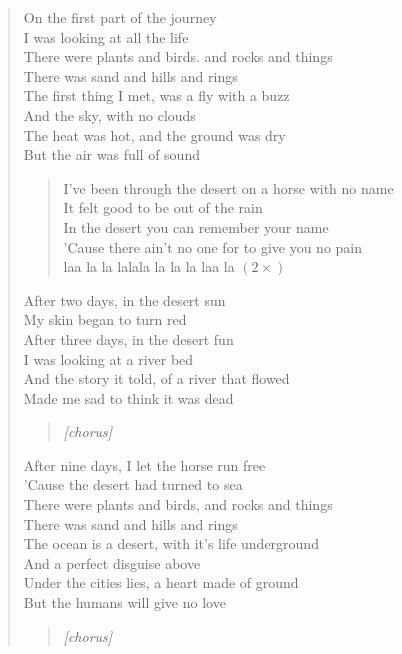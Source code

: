 \documentclass[9pt,a4paper,oneside, onecolumn]{article}
\begin{document}
\begin{verse}
On the  \Em{}first part of the journey\\
I was \Em{}looking at all the life\\
There were \Em{}plants and birds. and rocks and things\\
There was \Em{}sand and hills and rings\\
The \Em{}first thing I met, was a fly with a buzz\\
And the \Em{}sky, with no clouds\\
The \Em{}heat was hot, and the ground was dry\\
But the \Em{}air was full of sound\\


\begin{verse}
I've been through the desert on a horse with no name\\
It felt good to be out of the rain\\
In the desert you can remember your name\\
'Cause there ain't no one for to give you no pain\\

laa la la lalala la la la laa la \qquad $(2\times)$ \\
\end{verse}


After two days, in the desert sun\\
My skin began to turn red\\
After three days, in the desert fun\\
I was looking at a river bed\\
And the story it told, of a river that flowed\\
Made me sad to think it was dead\\

\begin{verse}
\textit{[chorus]}
\end{verse}


After nine days, I let the horse run free\\
'Cause the desert had turned to sea\\
There were plants and birds, and rocks and things\\
There was sand and hills and rings\\
The ocean is a desert, with it's life underground\\
And a perfect disguise above\\
Under the cities lies, a heart made of ground\\
But the humans will give no love\\


\begin{verse}
\textit{[chorus]}
\end{verse}


\end{verse}
\end{document}
